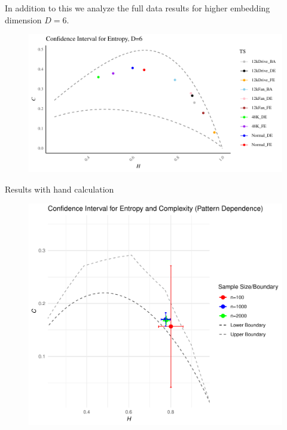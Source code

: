 \documentclass{beamer}
\begin{document}
\begin{frame}
	In addition to this we analyze the full data results for higher embedding dimension $D=6$.
		\begin{figure}[hbt]
		\centering
		\includegraphics[width=0.8 \textwidth]{Confidence Interval}
		\label{fig:EntopyComplexity Plane D=6}
	\end{figure}
\end{frame}

\begin{frame}{Results with hand calculation}
	\begin{figure}[hbt]
		\centering
		\includegraphics[width=0.8 \textwidth]{CI for pattern dependence}
		\end{figure}
\end{frame}
\end{document}
